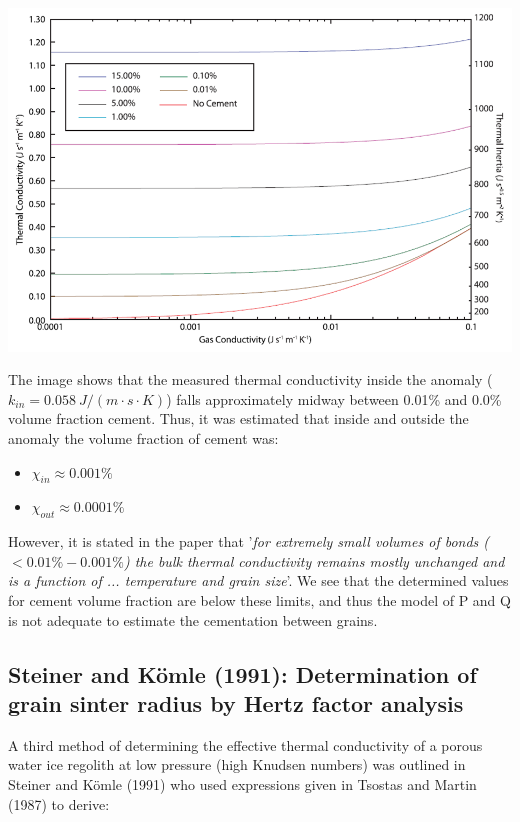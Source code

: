 \documentclass[11pt]{article} %
\begin{document}
	 \includegraphics[scale=0.5]{PandQ2009b_CementVolumeFraction.png}

	The image shows that the measured thermal conductivity inside the anomaly ($k_{in} = 0.058 \: J/(m \cdot s \cdot K)$) falls approximately midway between 0.01\% and 0.0\% volume fraction cement. Thus, it was estimated that inside and outside the anomaly the volume fraction of cement was:
	
	\begin{itemize}
	\item $\chi_{in} \approx 0.001\%$
	\item $\chi_{out} \approx 0.0001\%$
	\end{itemize}
	
	However, it is stated in the paper that '\emph{for extremely small volumes of bonds ($< 0.01\%-0.001\%$) the bulk thermal conductivity remains mostly unchanged and is a function of ... temperature and grain size}'. We see that the determined values for cement volume fraction are below these limits, and thus the model of P and Q is not adequate to estimate the cementation between grains. 
	
\subsection{Steiner and K\"{o}mle (1991): Determination of grain sinter radius by Hertz factor analysis}

	A third method of determining the effective thermal conductivity of a porous water ice regolith at low pressure (high Knudsen numbers) was outlined in Steiner and K\"{o}mle (1991) who used expressions given in Tsostas and Martin (1987) to derive:
\end{document}
